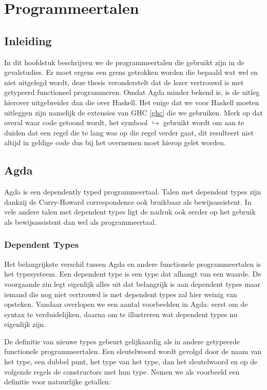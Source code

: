 \chapter{Programmeertalen}
\label{ch:agda-haskell}


\section{Inleiding}

In dit hoofdstuk beschrijven we de programmeertalen die gebruikt zijn in de
gevalstudies. Er moet ergens een grens getrokken worden die bepaald wat wel en
niet uitgelegd wordt, deze thesis veronderstelt dat de lezer vertrouwd is met
getypeerd functioneel programmeren. Omdat Agda minder bekend is, is de uitleg
hierover uitgebreider dan die over Haskell. Het enige dat we voor Haskell
moeten uitleggen zijn namelijk de extensies van GHC \ref{ghc} die we gebruiken.
Merk op dat overal waar code getoond wordt, het symbool
{\tiny\ensuremath{\hookrightarrow}} gebruikt wordt om aan te duiden dat een
regel die te lang was op die regel verder gaat, dit resulteert niet altijd in
geldige code dus bij het overnemen moet hierop gelet worden.


\section{Agda}

Agda is een dependently typed programmeertaal. Talen met dependent types zijn
dankzij de Curry-Howard correspondence ook bruikbaar als bewijsassistent. In
vele andere talen met dependent types ligt de nadruk ook eerder op het gebruik
als bewijsassistent dan wel als programmeertaal.

\subsection{Dependent Types}

Het belangrijkste verschil tussen Agda en andere functionele programmeertalen
is het typesysteem. Een dependent type is een type dat afhangt van een waarde.
De voorgaande zin legt eigenlijk alles uit dat belangrijk is aan dependent
types maar iemand die nog niet vertrouwd is met dependent types zal hier weinig
van opsteken. Vandaar overlopen we een aantal voorbeelden in Agda: eerst om de
syntax te verduidelijken, daarna om te illustreren wat dependent types nu
eigenlijk zijn.

De definitie van nieuwe types gebeurt gelijkaardig als in andere getypeerde
functionele programmeertalen. Een  sleutelwoord wordt gevolgd door
de naam van het type, een dubbel punt, het type van het type, dan het
sleutelwoord  en op de volgende regels de constructors met hun
type. Nemen we als voorbeeld een definitie voor natuurlijke getallen:

